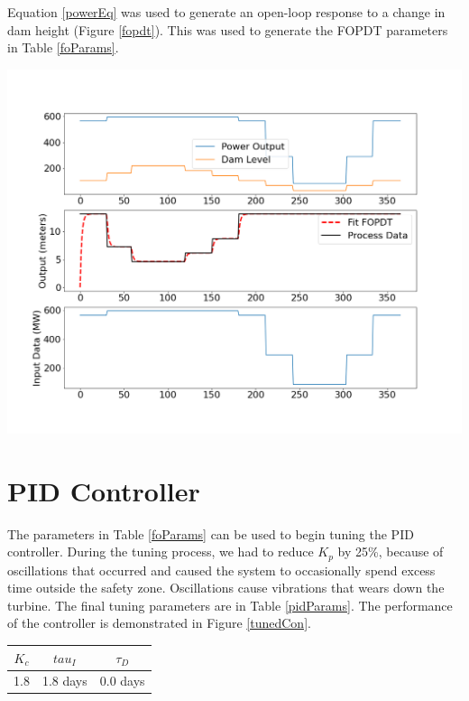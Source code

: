 \documentclass{article}
\begin{document}
\begin{multicols*}{2}
        Equation \ref{powerEq} was used to generate an open-loop response to a change in dam height (Figure \ref{fopdt}). This was used to generate the FOPDT parameters in Table \ref{foParams}.
        
        \vspace{5mm}
        \noindent
        \begin{minipage}{0.49\textwidth}
            \includegraphics[width=\textwidth]{FOPDT_big.png}
            \label{fopdt}
        \end{minipage}
            
        \section{PID Controller}
    
        The parameters in Table \ref{foParams} can be used to begin tuning the PID controller.  During the tuning process, we had to reduce $K_p$ by 25\%, because of oscillations that occurred and caused the system to occasionally spend excess time outside the safety zone. Oscillations cause vibrations that wears down the turbine. The final tuning parameters are in Table \ref{pidParams}. The performance of the controller is demonstrated in Figure \ref{tunedCon}.

        \begin{minipage}{0.9\columnwidth}
            \label{pidParams}
            \vspace{-1ex}
            \begin{center}
            \begin{tabular}{ccc}
                    \toprule
                    $K_c$ & $tau_I$ & $\tau_D$ \\
                    \midrule
                     1.8 & 1.8 days & 0.0 days
                \end{tabular}
            \end{center}
        \end{minipage}


\end{multicols*}
\end{document}
